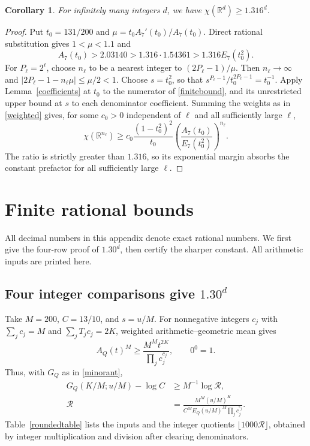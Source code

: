 \documentclass[12pt,a4paper]{article}
\newtheorem{corollary}[theorem]{Corollary}
\newcommand{\R}{\mathbb R}
\begin{document}
\begin{corollary}\label{subsequence}
For infinitely many integers $d$, we have $\chi(\R^d)\ge1.316^d$.
\end{corollary}
\begin{proof}
Put $t_0=131/200$ and $\mu=t_0A_7'(t_0)/A_7(t_0)$. Direct rational substitution gives $1<\mu<1.1$ and
\[
A_7(t_0)>2.03140>1.316\cdot1.54361>1.316E_7(t_0^2).
\]
For $P_\ell=2^\ell$, choose $n_\ell$ to be a nearest integer to $(2P_\ell-1)/\mu$. Then $n_\ell\to\infty$ and $|2P_\ell-1-n_\ell\mu|\le\mu/2<1$. Choose $s=t_0^2$, so that $s^{P_\ell-1}/t_0^{2P_\ell-1}=t_0^{-1}$. Apply Lemma~\ref{coefficients} at $t_0$ to the numerator of \eqref{finitebound}, and its unrestricted upper bound at $s$ to each denominator coefficient. Summing the weights as in \eqref{weighted} gives, for some $c_0>0$ independent of $\ell$ and all sufficiently large $\ell$,
\[
\chi(\R^{n_\ell})\ge
c_0\frac{(1-t_0^2)^2}{t_0}
\left(\frac{A_7(t_0)}{E_7(t_0^2)}\right)^{n_\ell}.
\]
The ratio is strictly greater than $1.316$, so its exponential margin absorbs the constant prefactor for all sufficiently large $\ell$.
\end{proof}

\appendix
\section{Finite rational bounds}\label{arithmetic}
All decimal numbers in this appendix denote exact rational numbers.
We first give the four-row proof of $1.30^d$, then certify the sharper constant. All arithmetic inputs are printed here.

\subsection{Four integer comparisons give \texorpdfstring{$1.30^d$}{1.30\string^d}}\label{rounded}
Take $M=200$, $C=13/10$, and $s=u/M$. For nonnegative integers $c_j$ with $\sum_jc_j=M$ and $\sum_jT_jc_j=2K$, weighted arithmetic--geometric mean gives
\[
A_Q(t)^M\ge\frac{M^M t^{2K}}{\prod_jc_j^{c_j}},\qquad 0^0=1.
\]
Thus, with $G_Q$ as in \eqref{minorant},
\begin{equation}\label{integerwitness}
\begin{split}
G_Q(K/M;u/M)-\log C&\ge M^{-1}\log\mathcal R,\\
\mathcal R&=\frac{M^M(u/M)^K}{C^M E_Q(u/M)^M\prod_jc_j^{c_j}}.
\end{split}
\end{equation}
Table~\ref{roundedtable} lists the inputs and the integer quotients $\lfloor1000\mathcal R\rfloor$, obtained by integer multiplication and division after clearing denominators.
\end{document}
